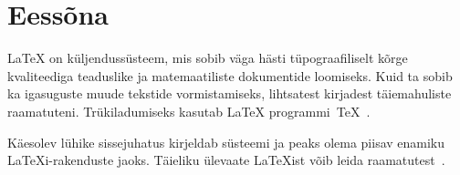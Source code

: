 

\chapter{Eessõna}

\LaTeX{} \cite{manual} on küljendussüsteem, mis sobib väga hästi
tüpograafiliselt kõrge kvaliteediga teaduslike ja matemaatiliste
dokumentide loomiseks. Kuid ta sobib ka igasuguste muude tekstide
vormistamiseks, lihtsatest kirjadest täiemahuliste raamatuteni.
Trükiladumiseks kasutab \LaTeX{} programmi~\TeX{}~\cite{texbook}.

Käesolev lühike sissejuhatus kirjeldab süsteemi \LaTeXe{} ja peaks olema
piisav enamiku \LaTeX i-rakenduste jaoks. Täieliku ülevaate \LaTeX ist
võib leida raamatutest~\cite{manual,companion}.

